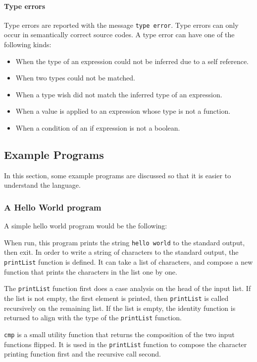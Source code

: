 \documentclass[12pt]{article}
\begin{document}
\paragraph{Type errors} Type errors are reported with the message
\verb$type error$. Type errors can only occur in semantically correct source
codes. A type error can have one of the following kinds:
\begin{itemize}
    \item When the type of an expression could not be inferred due to a self
        reference.
    \item When two types could not be matched.
    \item When a type wish did not match the inferred type of an expression.
    \item When a value is applied to an expression whose type is not a function.
    \item When a condition of an if expression is not a boolean.
\end{itemize}

\subsection{Example Programs}
\lstset{numbers=left}

In this section, some example programs are discussed so that it is easier to
understand the language.

\subsubsection{A Hello World program}

A simple hello world program would be the following:


When run, this program prints the string \verb$hello world$ to the standard
output, then exit. In order to write a string of characters to the standard
output, the \verb$printList$ function is defined. It can take a list of
characters, and compose a new function that prints the characters in the list
one by one.

The \verb$printList$ function first does a case analysis on the head of the
input list. If the list is not empty, the first element is printed, then
\verb$printList$ is called recursively on the remaining list. If the list is
empty, the identity function is returned to align with the type of the
\verb$printList$ function.

\verb$cmp$ is a small utility function that returns the composition of the two
input functions flipped. It is used in the \verb$printList$ function to compose
the character printing function first and the recursive call second.
\end{document}
